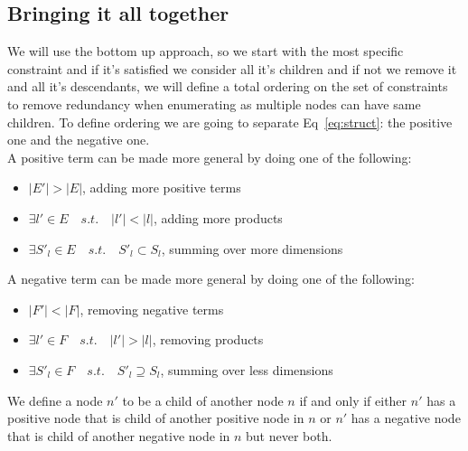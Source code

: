 \documentclass{article}
\begin{document}
\subsection{Bringing it all together}
We will use the bottom up approach, so we start with the most specific constraint and if it's satisfied we consider all it's children and if not we remove it and all it's descendants, we will define a total ordering on the set of constraints to remove redundancy when enumerating as multiple nodes can have same children. To define ordering we are going to separate Eq~\ref{eq:struct}: the positive one and the negative one.
\\
A positive term can be made more general by doing one of the following:
\begin{itemize}
\item $|E'| > |E|$, adding more positive terms
\item $\exists l'\in E \quad s.t. \quad  |l'| < |l|$, adding more products 
\item $\exists S'_l\in E \quad s.t. \quad S'_l \subset S_l$, summing over more dimensions
\end{itemize}
A negative term can be made more general by doing one of the following:
\begin{itemize}
\item $|F'| < |F|$, removing negative terms
\item $\exists l'\in F \quad s.t. \quad  |l'| > |l|$, removing products 
\item $\exists S'_l\in F \quad s.t. \quad S'_l \supseteq S_l$, summing over less dimensions
\end{itemize}
We define a node $n'$  to be a child of another node $n$ if and only if either $n'$ has a positive node that is child of another positive node in $n$ or $n'$ has a negative node that is child of another negative node in $n$ but never both.




\end{document}
